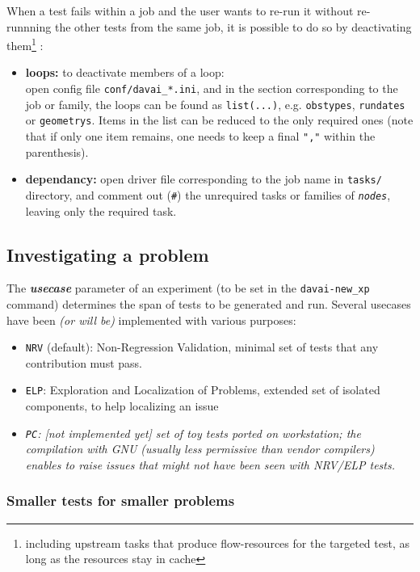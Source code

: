 \documentclass[a4paper,10pt,twoside]{article}
\begin{document}
When a test fails within a job and the user wants to re-run it without re-runnning the other tests from the same job, it is possible to do so by deactivating them\footnote{including upstream tasks that produce flow-resources for the targeted test, as long as the resources stay in cache} :
\begin{itemize}[label=$\rightarrow$]
        \item \textbf{loops:} to deactivate members of a loop:\\
        open config file \texttt{conf/davai\_*.ini}, and in the section corresponding to the job or family, the loops can be found as \texttt{list(...)}, e.g. \texttt{obstypes}, \texttt{rundates} or \texttt{geometrys}. Items in the list can be reduced to the only required ones (note that if only one item remains, one needs to keep a final \texttt{","} within the parenthesis).
        \item \textbf{dependancy:} open driver file corresponding to the job name in \texttt{tasks/} directory, and comment out (\texttt{\#}) the unrequired tasks or families of \textit{\texttt{nodes}}, leaving only the required task.
\end{itemize}




\subsection{\label{sect:investigating}Investigating a problem}

The \textit{\textbf{usecase}} parameter of an experiment (to be set in the \texttt{davai-new\_xp} command) determines the span of tests to be generated and run. Several usecases have been \textit{(or will be)} implemented with various purposes:
  \begin{itemize}
   \item \texttt{NRV} (default): Non-Regression Validation, minimal set of tests that any contribution must pass.
   \item \texttt{ELP}: Exploration and Localization of Problems, extended set of isolated components, to help localizing an issue
   \item \textit{\texttt{PC}: [not implemented yet] set of toy tests ported on workstation; the compilation with GNU (usually less permissive than vendor compilers) enables to raise issues that might not have been seen with NRV/ELP tests.}
  \end{itemize}

\subsubsection*{Smaller tests for smaller problems}
\end{document}
